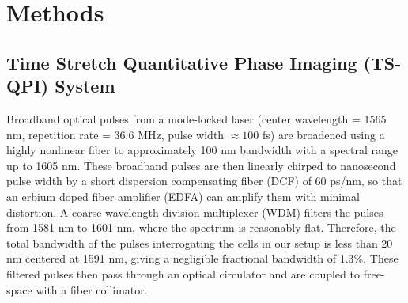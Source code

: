 \documentclass[aps,pra,reprint,longbibliography,superscriptaddress]{revtex4-1}
\begin{document}
\section{\label{scn:Methods} Methods}

\subsection{Time Stretch Quantitative Phase Imaging (TS-QPI) System}

Broadband optical pulses from a mode-locked laser (center wavelength = 1565 nm, repetition rate = 36.6 MHz, pulse width $\approx100$ fs) are broadened using a highly nonlinear fiber to approximately 100 nm bandwidth with a spectral range up to 1605 nm. These broadband pulses are then linearly chirped to nanosecond pulse width by a short dispersion compensating fiber (DCF) of 60 ps/nm, so that an erbium doped fiber amplifier (EDFA) can amplify them with minimal distortion. A coarse wavelength division multiplexer (WDM) filters the pulses from 1581 nm to 1601 nm, where the spectrum is reasonably flat. Therefore, the total bandwidth of the pulses interrogating the cells in our setup is less than 20 nm centered at 1591 nm, giving a negligible fractional bandwidth of 1.3\%. These filtered pulses then pass through an optical circulator and are coupled to free-space with a fiber collimator.
\end{document}
